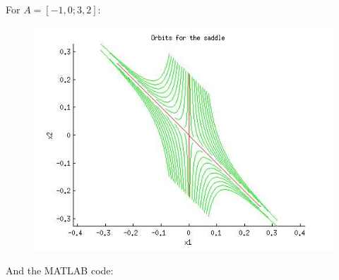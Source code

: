 \documentclass[twoside]{article}
\begin{document}
For $A = [-1,0;3,2]$:

\begin{figure}[!ht]
\centering
\includegraphics[scale=0.75]{saddle.jpg}
\end{figure}

\newpage

And the MATLAB code:
\end{document}
